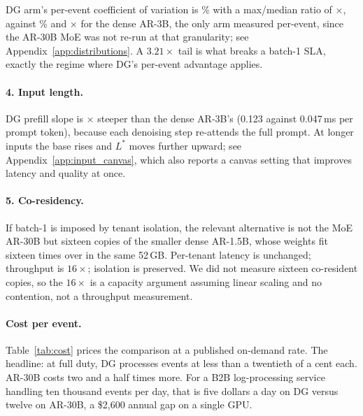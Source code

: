 DG arm's per-event coefficient of variation is \dgEventCV\%
with a max/median ratio of \dgMaxMed$\times$, against
\arEventCV\% and \arMaxMed$\times$ for the dense AR-3B, the only arm
measured per-event, since the AR-30B MoE was not re-run at that
granularity; see Appendix~\ref{app:distributions}.
A $3.21\times$ tail is what breaks a batch-1 SLA, exactly the
regime where DG's per-event advantage applies.

\paragraph{4. Input length.}

DG prefill slope is $\times$ steeper than
the dense AR-3B's (0.123 against 0.047\,ms per prompt token), because
each denoising step re-attends the full prompt. At
longer inputs the base rises and $L^{*}$ moves further upward; see
Appendix~\ref{app:input_canvas}, which also reports a canvas setting
that improves latency and quality at once.

\paragraph{5. Co-residency.}

If batch-1 is imposed by tenant isolation, the relevant alternative is
not the MoE AR-30B but sixteen copies of the smaller dense AR-1.5B,
whose weights fit sixteen times over in the same 52\,GB. Per-tenant
latency is unchanged; throughput is $16\times$; isolation is preserved.
We did not measure sixteen co-resident copies, so the $16\times$ is a
capacity argument assuming linear scaling and no contention, not a
throughput measurement.

\paragraph{Cost per event.}

Table~\ref{tab:cost} prices the comparison at a published on-demand
rate. The headline: at full duty, DG processes events at less than a
twentieth of a cent each. AR-30B costs two and a half times more. For a
B2B log-processing service handling ten thousand events per day, that
is five dollars a day on DG versus twelve on AR-30B, a
\$2{,}600 annual gap on a single GPU.

